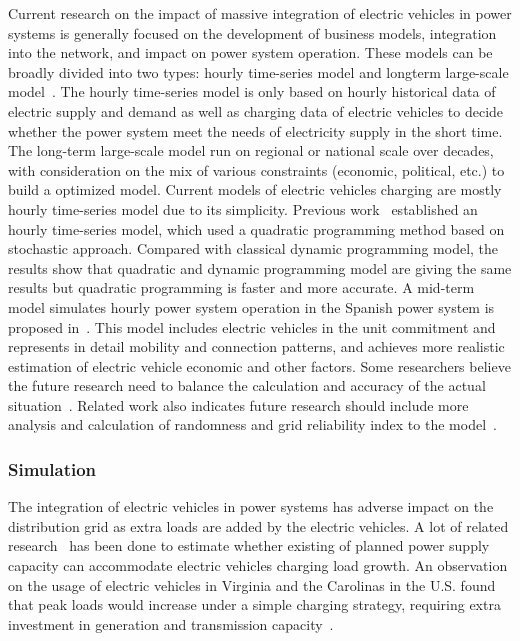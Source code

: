 Current research on the impact of massive integration of electric vehicles in power systems is generally focused on the development of business models, integration into the network, and impact on power system operation.
These models can be broadly divided into two types: hourly time-series model and longterm large-scale model~\cite{YC_David}. 
The hourly time-series model is only based on hourly historical data of electric supply and demand as well as charging data of electric vehicles to decide whether the power system meet the needs of electricity supply in the short time. 
The long-term large-scale model run on regional or national scale over decades, with consideration on the mix of various constraints (economic, political, etc.) to build a optimized model.
Current models of electric vehicles charging are mostly hourly time-series model due to its simplicity.     
Previous work~\cite{YC_Stochastic} established an hourly time-series model, which used a quadratic programming method based on stochastic approach. Compared with classical dynamic programming model, the results show that quadratic and dynamic programming model are giving the same results but quadratic programming is faster and more accurate.
A mid-term model simulates hourly power system operation in the Spanish power system is proposed in~\cite{YC_Fernandes}. 
This model includes electric vehicles in the unit commitment and represents in detail mobility and connection patterns, and achieves more realistic estimation of electric vehicle economic and other factors.
Some researchers believe the future research need to balance the calculation and accuracy of the actual situation~\cite{YC_David}. 
Related work also indicates future research should include more analysis and calculation of randomness and grid reliability index to the model~\cite{YC_Green}.

\subsubsection{Simulation}
 
The integration of electric vehicles in power systems has adverse impact on the distribution grid as extra loads are added by the electric vehicles.   
A lot of related research~\cite{YC_Hadley,YC_Hadley18,YC_Letendre19,YC_Kintner20,YC_Denholm21,YC_Hajimiragha23,YC_Hajimiragha24,YC_Hartmann25} has been done to estimate whether existing of planned power supply capacity can accommodate electric vehicles charging load growth.
An observation on the usage of electric vehicles in Virginia and the Carolinas in the U.S. found that peak loads would increase under a simple charging strategy, requiring extra investment in generation and transmission capacity~\cite{YC_Hadley18}.

